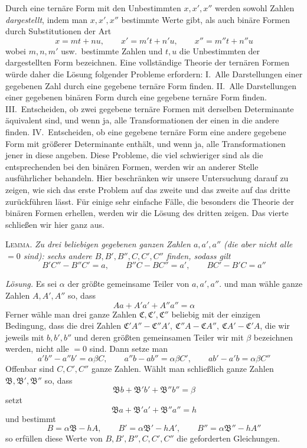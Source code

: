 Durch eine ternäre Form mit den Unbestimmten $x,x',x''$ werden sowohl Zahlen \textit{dargestellt}, indem man $x,x',x''$ bestimmte Werte gibt, als auch binäre Formen durch Substitutionen der Art
\[
x=mt+nu,\qquad x'=m't+n'u,\qquad x''=m''t+n''u
\]
wobei $m,n,m'$ usw.\ bestimmte Zahlen und $t,u$ die Unbestimmten der dargestellten Form bezeichnen. Eine vollständige Theorie der ternären Formen würde daher die Lösung folgender Probleme erfordern: I.\ Alle Darstellungen einer gegebenen Zahl durch eine gegebene ternäre Form finden. II.\ Alle Darstellungen einer gegebenen binären Form durch eine gegebene ternäre Form finden. III.\ Entscheiden, ob zwei gegebene ternäre Formen mit derselben Determinante äquivalent sind, und wenn ja, alle Transformationen der einen in die andere finden. IV.\ Entscheiden, ob eine gegebene ternäre Form eine andere gegebene Form mit größerer Determinante enthält, und wenn ja, alle Transformationen jener in diese angeben. Diese Probleme, die viel schwieriger sind als die entsprechenden bei den binären Formen, werden wir an anderer Stelle ausführlicher behandeln. Hier beschränken wir unsere Untersuchung darauf zu zeigen, wie sich das erste Problem auf das zweite und das zweite auf das dritte zurückführen lässt. Für einige sehr einfache Fälle, die besonders die Theorie der binären Formen erhellen, werden wir die Lösung des dritten zeigen. Das vierte schließen wir hier ganz aus.

\textsc{Lemma.} \textit{Zu drei beliebigen gegebenen ganzen Zahlen $a,a',a''$ (die aber nicht alle $=0$ sind): sechs andere $B,B',B'',C,C',C''$ finden, sodass gilt}
\[
B'C''-B''C'=a,\qquad B''C-BC''=a',\qquad BC'-B'C=a''
\]

\textit{Lösung.} Es sei $\alpha$ der größte gemeinsame Teiler von $a,a',a''$. und man wähle ganze Zahlen $A,A',A''$ so, dass
\[
Aa+A'a'+A''a''=\alpha
\]
Ferner wähle man drei ganze Zahlen $\mathfrak{C},\allowbreak \mathfrak{C}',\allowbreak \mathfrak{C}''$ beliebig mit der einzigen Bedingung, dass die drei Zahlen
$\mathfrak{C}'A''-\mathfrak{C}''A',\allowbreak \ \mathfrak{C}''A-\mathfrak{C}A'',\allowbreak \
\mathfrak{C}A'-\mathfrak{C}'A$, die wir jeweils mit $b,b',b''$ und deren größten gemeinsamen Teiler wir mit $\beta$ bezeichnen werden, nicht alle $=0$ sind. Dann setze man
\[
a'b''-a''b'=\alpha\beta C,\qquad
a''b-ab''=\alpha\beta C',\qquad
ab'-a'b=\alpha\beta C''
\]
Offenbar sind $C,C',C''$ ganze Zahlen. Wählt man schließlich ganze Zahlen
$\mathfrak{B},\allowbreak \mathfrak{B}',\allowbreak \mathfrak{B}''$ so, dass
\[
\mathfrak{B}b+\mathfrak{B}'b'+\mathfrak{B}''b''=\beta
\]
setzt
\[
\mathfrak{B}a+\mathfrak{B}'a'+\mathfrak{B}''a''=h
\]
und bestimmt
\[
B=\alpha\mathfrak{B}-hA,\qquad
B'=\alpha\mathfrak{B}'-hA',\qquad
B''=\alpha\mathfrak{B}''-hA''
\]
so erfüllen diese Werte von $B,B',B'',C,C',C''$ die geforderten Gleichungen.

